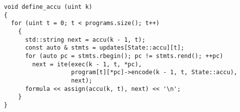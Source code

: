 %
%

\newpage

\begin{lstlisting}[style=c++]
void define_accu (uint k)
{
  for (uint t = 0; t < programs.size(); t++)
    {
      std::string next = accu(k - 1, t);
      const auto & stmts = updates[State::accu][t];
      for (auto pc = stmts.rbegin(); pc != stmts.rend(); ++pc)
        next = ite(exec(k - 1, t, *pc),
                   program[t][*pc]->encode(k - 1, t, State::accu),
                   next);
      formula << assign(accu(k, t), next) << '\n';
    }
}
\end{lstlisting}

